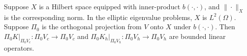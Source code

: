 \documentclass[leqno,CJK]{siamltex704}
\numberwithin{equation}{section}
\begin{document}
	Suppose $X$ is a Hilbert space equipped with inner-product $b(\cdot,\cdot)$, and $\|\cdot\|_X$ is the
	corresponding norm. In the elliptic eigenvalue problems, $X$ is $L^2(\Omega)$. Suppose $\Pi_0$ is
	the orthogonal projection from $V$ onto $X$ under $b(\cdot,\cdot)$.
	Then
	$\Pi_0K|_{\Pi_0V_c}: \Pi_0V_c\rightarrow \Pi_0V_c$ and $\Pi_0K_h|_{\Pi_0V_h}: \Pi_0V_h\rightarrow \Pi_0V_h$ are bounded linear operators.

	
\end{document}

